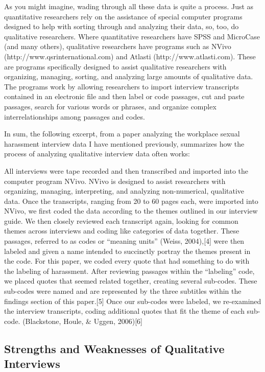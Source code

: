As you might imagine, wading through all these data is quite a process. Just as quantitative researchers rely on the assistance of special computer programs designed to help with sorting through and analyzing their data, so, too, do qualitative researchers. Where quantitative researchers have SPSS and MicroCase (and many others), qualitative researchers have programs such as NVivo (http://www.qsrinternational.com) and Atlasti (http://www.atlasti.com). These are programs specifically designed to assist qualitative researchers with organizing, managing, sorting, and analyzing large amounts of qualitative data. The programs work by allowing researchers to import interview transcripts contained in an electronic file and then label or code passages, cut and paste passages, search for various words or phrases, and organize complex interrelationships among passages and codes.

In sum, the following excerpt, from a paper analyzing the workplace sexual harassment interview data I have mentioned previously, summarizes how the process of analyzing qualitative interview data often works:

All interviews were tape recorded and then transcribed and imported into the computer program NVivo. NVivo is designed to assist researchers with organizing, managing, interpreting, and analyzing non-numerical, qualitative data. Once the transcripts, ranging from 20 to 60 pages each, were imported into NVivo, we first coded the data according to the themes outlined in our interview guide. We then closely reviewed each transcript again, looking for common themes across interviews and coding like categories of data together. These passages, referred to as codes or “meaning units” (Weiss, 2004),[4] were then labeled and given a name intended to succinctly portray the themes present in the code. For this paper, we coded every quote that had something to do with the labeling of harassment. After reviewing passages within the “labeling” code, we placed quotes that seemed related together, creating several sub-codes. These sub-codes were named and are represented by the three subtitles within the findings section of this paper.[5] Once our sub-codes were labeled, we re-examined the interview transcripts, coding additional quotes that fit the theme of each sub-code. (Blackstone, Houle, \& Uggen, 2006)[6]

\subsection{Strengths and Weaknesses of Qualitative Interviews}

